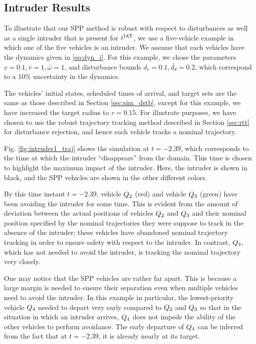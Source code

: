\subsection{Intruder Results \label{sec:basic_results}}
To illustrate that our SPP method is robust with respect to disturbances as well as a single intruder that is present for $t^\text{IAT}$, we use a five-vehicle example in which one of the five vehicles is an intruder. We assume that each vehicles have the dynamics given in \eqref{eq:dyn_i}. For this example, we chose the parameters $\underline{v} = 0.1, \bar{v} = 1, \bar\omega = 1$, and disturbance bounds $d_{r} = 0.1, \bar{d_{\theta}} = 0.2$, which correspond to a 10\% uncertainty in the dynamics. 

The vehicles' initial states, scheduled times of arrival, and target sets are the same as those described in Section \ref{sec:sim_dstb}, except for this example, we have increased the target radius to $r=0.15$. For illustrate purposes, we have chosen to use the robust trajectory tracking method described in Section \ref{sec:rtt} for disturbance rejection, and hence each vehicle tracks a nominal trajectory.

Fig. \ref{fig:intruder1_traj} shows the simulation at $t = -2.39$, which corresponds to the time at which the intruder ``disappears'' from the domain. This time is chosen to highlight the maximum impact of the intruder. Here, the intruder is shown in black, and the SPP vehicles are shown in the other different colors.

By this time instant $t = -2.39$, vehicle $Q_2$ (red) and vehicle $Q_3$ (green) have been avoiding the intruder for some time. This is evident from the amount of deviation between the actual positions of vehicles $Q_2$ and $Q_3$ and their nominal position specified by the nominal trajectories they were suppose to track in the absence of the intruder; these vehicles have abandoned nominal trajectory tracking in order to ensure safety with respect to the intruder. In contrast, $Q_4$, which has not needed to avoid the intruder, is tracking the nominal trajectory very closely.

One may notice that the SPP vehicles are rather far apart. This is because a large margin is needed to ensure their separation even when multiple vehicles need to avoid the intruder. In this example in particular, the lowest-priority vehicle $Q_4$ needed to depart very early compared to $Q_2$ and $Q_3$ so that in the situation in which an intruder arrives, $Q_4$ does not impede the ability of the other vehicles to perform avoidance. The early departure of $Q_4$ can be inferred from the fact that at $t=-2.39$, it is already nearly at its target.

